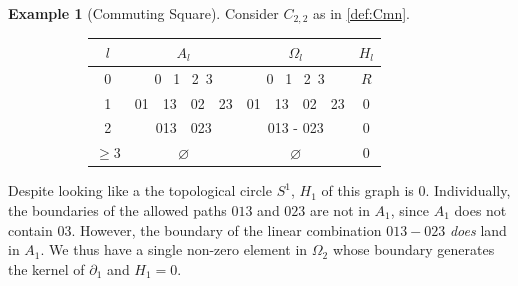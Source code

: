 \documentclass[11pt]{article}
\theoremstyle{definition}
\newtheorem{example}[theo]{Example}
\numberwithin{equation}{section}
\newcommand{\bd}{\partial}
\begin{document}
\begin{example}[Commuting Square]\label{ex:commuting_square} 
Consider $C_{2,2}$ as in \cref{def:Cmn}.

    \begin{figure}[H]
        \centering
        \begin{subfigure}[c]{0.3\textwidth}
        \end{subfigure}
        \begin{subfigure}[c]{0.6\textwidth}
        \centering
        \begin{tabular}{||c||  c | c | c ||} 
         \hline
         $l$ &  $A_l$ & $\Omega_l$ & $H_l$ \\ [.5ex] 
         \hline\hline
        0 &  0 \, 1 \, 2 \,3 & 0 \, 1 \, 2 \,3 & $R$ \\ 
         \hline
          1 & 01\,\,\,\, 13\,\,\,\, 02 \,\,\,\,23 & 01\,\,\,\, 13\,\,\,\, 02 \,\,\,\,23 & 0\\ 
         \hline
          2 & 013\,\,\,\, 023 & 013 - 023 & 0\\ 
         \hline
          $\geq 3$ & $\varnothing$ & $\varnothing$ & 0 \\
         \hline
        \end{tabular}
        \end{subfigure}
    \end{figure}  
Despite looking like a the topological circle $S^1$, $H_1$ of this graph is $0$.
Individually, the boundaries of the allowed paths $013$ and $023$ are not in $A_1$, since $A_1$ does not contain $03$.
However, the boundary of the linear combination $013 - 023$ \emph{does} land in $A_1$.
We thus have a single non-zero element in $\Omega_2$ whose boundary generates the kernel of $\bd_1$ and $H_1 = 0$. 
\end{example}
\end{document}

